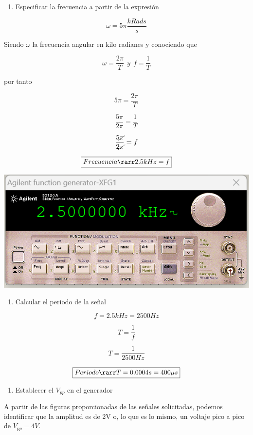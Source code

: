 \documentclass[
]{article}
\providecommand{\tightlist}{%
  \setlength{\itemsep}{0pt}\setlength{\parskip}{0pt}}
\begin{document}
\begin{enumerate}
\def\labelenumi{\arabic{enumi}.}
\tightlist
\item
  Especificar la frecuencia a partir de la expresión
\end{enumerate}

\[\omega = 5\pi \frac{kRads}{s}\]

Siendo \(\omega\) la frecuencia angular en kilo radianes y conociendo
que

\[\omega = \frac{2 \pi}{T} \ \ y \ \ f = \frac{1}{T}\]

por tanto

\[5\pi = \frac{2\pi}{T}\]

\[\frac{5\pi}{2\pi} = \frac{1}{T}\]

\[\frac{5\cancel{\pi}}{2\cancel{\pi}} = f\]

\[\boxed{Frecuencia \rarr 2.5kHz = f}\]

\includegraphics{2023-05-18-20-29-16.png}

\begin{enumerate}
\def\labelenumi{\arabic{enumi}.}
\setcounter{enumi}{1}
\tightlist
\item
  Calcular el periodo de la señal
\end{enumerate}

\[f = 2.5kHz = 2500Hz\]

\[T = \frac{1}{f}\]

\[T = \frac{1}{2500Hz}\]

\[\boxed{Periodo \rarr T = 0.0004s = 400\mu s} \]

\begin{enumerate}
\def\labelenumi{\arabic{enumi}.}
\setcounter{enumi}{2}
\tightlist
\item
  Establecer el \(V_{pp}\) en el generador
\end{enumerate}

A partir de las figuras proporcionadas de las señales solicitadas,
podemos identificar que la amplitud es de 2V o, lo que es lo mismo, un
voltaje pico a pico de \(V_{pp} = 4V\).
\end{document}
